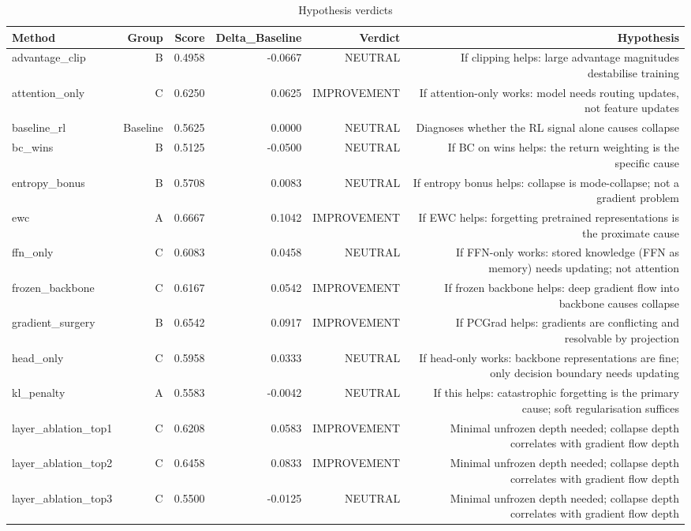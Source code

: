 \begin{table}[htbp]
\centering
\caption{Hypothesis verdicts}
\label{tab:hyp-verdicts}
\begin{tabular}{lrrrrr}
\toprule
\textbf{Method} & \textbf{Group} & \textbf{Score} & \textbf{Delta\_Baseline} & \textbf{Verdict} & \textbf{Hypothesis} \\
\midrule
advantage\_clip & B & 0.4958 & -0.0667 & NEUTRAL & If clipping helps: large advantage magnitudes destabilise training \\
attention\_only & C & 0.6250 & 0.0625 & IMPROVEMENT & If attention-only works: model needs routing updates, not feature updates \\
baseline\_rl & Baseline & 0.5625 & 0.0000 & NEUTRAL & Diagnoses whether the RL signal alone causes collapse \\
bc\_wins & B & 0.5125 & -0.0500 & NEUTRAL & If BC on wins helps: the return weighting is the specific cause \\
entropy\_bonus & B & 0.5708 & 0.0083 & NEUTRAL & If entropy bonus helps: collapse is mode-collapse; not a gradient problem \\
ewc & A & 0.6667 & 0.1042 & IMPROVEMENT & If EWC helps: forgetting pretrained representations is the proximate cause \\
ffn\_only & C & 0.6083 & 0.0458 & NEUTRAL & If FFN-only works: stored knowledge (FFN as memory) needs updating; not attention \\
frozen\_backbone & C & 0.6167 & 0.0542 & IMPROVEMENT & If frozen backbone helps: deep gradient flow into backbone causes collapse \\
gradient\_surgery & B & 0.6542 & 0.0917 & IMPROVEMENT & If PCGrad helps: gradients are conflicting and resolvable by projection \\
head\_only & C & 0.5958 & 0.0333 & NEUTRAL & If head-only works: backbone representations are fine; only decision boundary needs updating \\
kl\_penalty & A & 0.5583 & -0.0042 & NEUTRAL & If this helps: catastrophic forgetting is the primary cause; soft regularisation suffices \\
layer\_ablation\_top1 & C & 0.6208 & 0.0583 & IMPROVEMENT & Minimal unfrozen depth needed; collapse depth correlates with gradient flow depth \\
layer\_ablation\_top2 & C & 0.6458 & 0.0833 & IMPROVEMENT & Minimal unfrozen depth needed; collapse depth correlates with gradient flow depth \\
layer\_ablation\_top3 & C & 0.5500 & -0.0125 & NEUTRAL & Minimal unfrozen depth needed; collapse depth correlates with gradient flow depth \\

\end{tabular}
\end{table}

